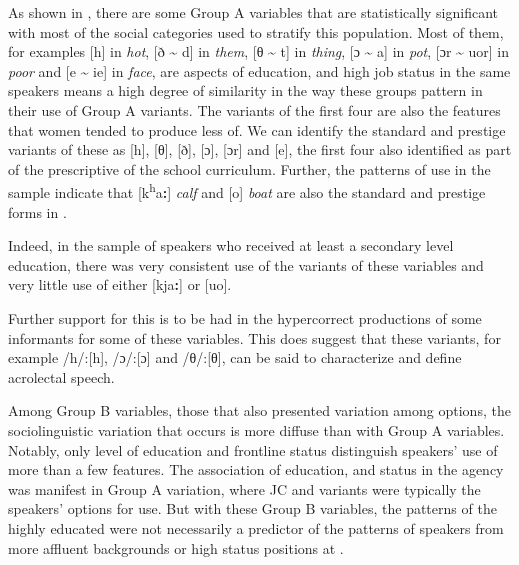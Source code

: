   As shown in , there are some Group A variables that are statistically significant with most of the social categories used to stratify this population.  Most of them, for examples [h] in \textit{hot}, [ð {\textasciitilde} d] in \textit{them}, [θ {\textasciitilde} t] in \textit{thing}, [ɔ {\textasciitilde} a] in \textit{pot}, [ɔr {\textasciitilde} uor] in \textit{poor} and [e {\textasciitilde} ie] in \textit{face}, are aspects of education,  and high job status in the same speakers means a high degree of similarity in the way these groups pattern in their use of Group A variants.  The  variants of the first four are also the features that women tended to produce less of.  We can identify the standard and prestige variants of these as [h], [θ], [ð], [ɔ], [ɔr] and [e], the first four also identified as part of the prescriptive  of the school curriculum.  Further, the patterns of use in the sample indicate that [k\textsuperscript{h}a\textbf{:}] \textit{calf} and [o] \textit{boat} are also the standard and prestige forms in .  

Indeed, in the sample of speakers who received at least a secondary level education, there was very consistent use of the  variants of these variables and very little use of either [kja\textbf{:}] or [uo].

Further support for this is to be had in the hypercorrect productions of some informants for some of these variables.  This  does suggest that these variants, for example /h/:[h],  /ɔ/:[ɔ] and /θ/:[θ], can be said to characterize and define acrolectal speech. 

Among Group B variables, those that also presented variation among  options, the sociolinguistic variation that occurs is more diffuse than with Group A variables.  Notably, only level of education and frontline status distinguish speakers’ use of more than a few features.  The association of education,  and status in the agency was manifest in Group A variation, where JC and  variants were typically the speakers’ options for use.  But with these Group B variables, the patterns of the highly educated were not necessarily a predictor of the patterns of speakers from more affluent backgrounds or high status positions at .

